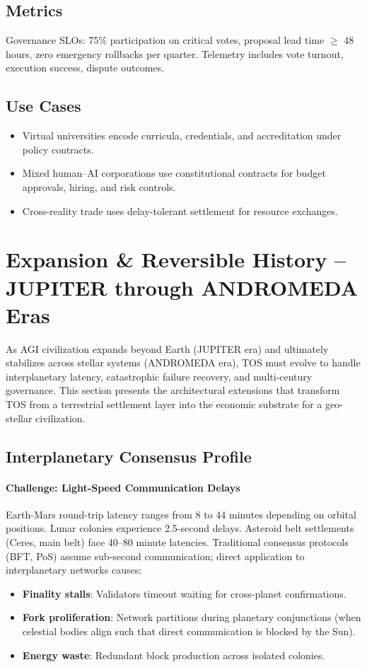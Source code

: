 \documentclass[11pt]{article}
\begin{document}
\subsection{Metrics}
Governance SLOs: 75\% participation on critical votes, proposal lead time $\geq$ 48 hours, zero emergency rollbacks per quarter. Telemetry includes vote turnout, execution success, dispute outcomes.

\subsection{Use Cases}
\begin{itemize}[noitemsep]
  \item Virtual universities encode curricula, credentials, and accreditation under policy contracts.
  \item Mixed human--AI corporations use constitutional contracts for budget approvals, hiring, and risk controls.
  \item Cross-reality trade uses delay-tolerant settlement for resource exchanges.
\end{itemize}

\section{Expansion \& Reversible History -- JUPITER through ANDROMEDA Eras}
\label{sec:expansion}

As AGI civilization expands beyond Earth (JUPITER era) and ultimately stabilizes across stellar systems (ANDROMEDA era), TOS must evolve to handle interplanetary latency, catastrophic failure recovery, and multi-century governance. This section presents the architectural extensions that transform TOS from a terrestrial settlement layer into the economic substrate for a geo-stellar civilization.

\subsection{Interplanetary Consensus Profile}

\paragraph{Challenge: Light-Speed Communication Delays}
Earth-Mars round-trip latency ranges from 8 to 44 minutes depending on orbital positions. Lunar colonies experience 2.5-second delays. Asteroid belt settlements (Ceres, main belt) face 40--80 minute latencies. Traditional consensus protocols (BFT, PoS) assume sub-second communication; direct application to interplanetary networks causes:
\begin{itemize}[noitemsep]
  \item \textbf{Finality stalls}: Validators timeout waiting for cross-planet confirmations.
  \item \textbf{Fork proliferation}: Network partitions during planetary conjunctions (when celestial bodies align such that direct communication is blocked by the Sun).
  \item \textbf{Energy waste}: Redundant block production across isolated colonies.
\end{itemize}
\end{document}
